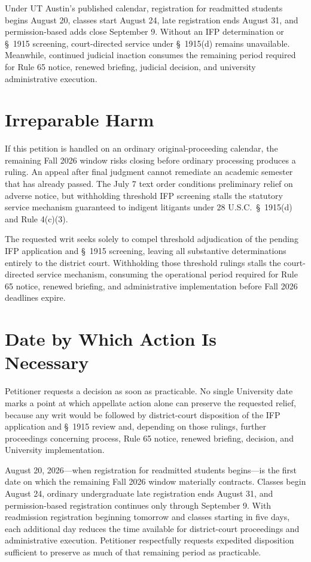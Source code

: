 \documentclass[14pt]{extarticle}
\begin{document}
Under UT Austin’s published calendar, registration for readmitted students begins August 20, classes start August 24, late registration ends August 31, and permission-based adds close September 9. Without an IFP determination or \S\ 1915 screening, court-directed service under \S\ 1915(d) remains unavailable. Meanwhile, continued judicial inaction consumes the remaining period required for Rule 65 notice, renewed briefing, judicial decision, and university administrative execution.

\section*{Irreparable Harm}

If this petition is handled on an ordinary original-proceeding calendar, the remaining Fall 2026 window risks closing before ordinary processing produces a ruling. An appeal after final judgment cannot remediate an academic semester that has already passed. The July 7 text order conditions preliminary relief on adverse notice, but withholding threshold IFP screening stalls the statutory service mechanism guaranteed to indigent litigants under 28 U.S.C.\ \S\ 1915(d) and Rule 4(c)(3).

The requested writ seeks solely to compel threshold adjudication of the pending IFP application and \S\ 1915 screening, leaving all substantive determinations entirely to the district court. Withholding those threshold rulings stalls the court-directed service mechanism, consuming the operational period required for Rule 65 notice, renewed briefing, and administrative implementation before Fall 2026 deadlines expire.

\section*{Date by Which Action Is Necessary}

Petitioner requests a decision as soon as practicable. No single University date marks a point at which appellate action alone can preserve the requested relief, because any writ would be followed by district-court disposition of the IFP application and \S\ 1915 review and, depending on those rulings, further proceedings concerning process, Rule 65 notice, renewed briefing, decision, and University implementation.

August 20, 2026---when registration for readmitted students begins---is the first date on which the remaining Fall 2026 window materially contracts. Classes begin August 24, ordinary undergraduate late registration ends August 31, and permission-based registration continues only through September 9. With readmission registration beginning tomorrow and classes starting in five days, each additional day reduces the time available for district-court proceedings and administrative execution. Petitioner respectfully requests expedited disposition sufficient to preserve as much of that remaining period as practicable.
\end{document}
